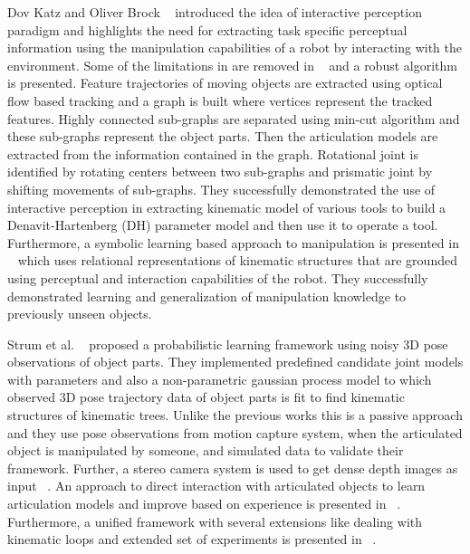 \documentclass[12pt,a4paper]{report}
\begin{document}
Dov Katz and Oliver Brock ~\cite{katz2007interactive} introduced the idea of interactive perception paradigm and highlights the need for extracting task specific perceptual information using the manipulation capabilities of a robot by interacting with the environment. Some of the limitations in \cite{katz2007interactive} are removed in ~\cite{katz2008manipulating} and a robust algorithm is presented. Feature trajectories of moving objects are extracted using optical flow based tracking and a graph is built where vertices represent the tracked features. Highly connected sub-graphs are separated using min-cut algorithm and these sub-graphs represent the object parts. Then the articulation models are extracted from the information contained in the graph. Rotational joint is identified by rotating centers between two sub-graphs and prismatic joint by shifting movements of sub-graphs. They successfully demonstrated the use of interactive perception in extracting kinematic model of various tools to build a Denavit-Hartenberg (DH) parameter model and then use it to operate a tool. Furthermore, a symbolic learning based approach to manipulation is presented in ~\cite{brock2009learning} which uses relational representations of kinematic structures that are grounded using perceptual and interaction capabilities of the robot. They successfully demonstrated learning and generalization of manipulation knowledge to previously unseen objects. 

Strum et al. ~\cite{sturm2009learning} proposed a probabilistic learning framework using noisy 3D pose observations of object parts. They implemented predefined candidate joint models with parameters and also a non-parametric gaussian process model to which observed 3D pose trajectory data of object parts is fit to find kinematic structures of kinematic trees. Unlike the previous works this is a passive approach and they use pose observations from motion capture system, when the articulated object is manipulated by someone, and simulated data to validate their framework. Further, a stereo camera system is used to get dense depth images as input ~\cite{sturm20103d}. An approach to direct interaction with articulated objects to learn articulation models and improve based on experience is presented in ~\cite{sturm2010operating}. Furthermore, a unified framework with several extensions like dealing with kinematic loops and extended set of experiments is presented in ~\cite{sturm2011probabilistic}.
\end{document}
